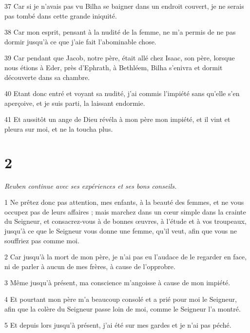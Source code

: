 \par 37 Car si je n'avais pas vu Bilha se baigner dans un endroit couvert, je ne serais pas tombé dans cette grande iniquité.

\par 38 Car mon esprit, pensant à la nudité de la femme, ne m'a permis de ne pas dormir jusqu'à ce que j'aie fait l'abominable chose.

\par 39 Car pendant que Jacob, notre père, était allé chez Isaac, son père, lorsque nous étions à Eder, près d'Ephrath, à Bethléem, Bilha s'enivra et dormit découverte dans sa chambre.

\par 40 Etant donc entré et voyant sa nudité, j'ai commis l'impiété sans qu'elle s'en aperçoive, et je suis parti, la laissant endormie.

\par 41 Et aussitôt un ange de Dieu révéla à mon père mon impiété, et il vint et pleura sur moi, et ne la toucha plus.

\chapter{2}

\par \textit{Reuben continue avec ses expériences et ses bons conseils.}

\par 1 Ne prêtez donc pas attention, mes enfants, à la beauté des femmes, et ne vous occupez pas de leurs affaires ; mais marchez dans un cœur simple dans la crainte du Seigneur, et consacrez-vous à de bonnes œuvres, à l'étude et à vos troupeaux, jusqu'à ce que le Seigneur vous donne une femme, qu'il veut, afin que vous ne souffriez pas comme moi.

\par 2 Car jusqu'à la mort de mon père, je n'ai pas eu l'audace de le regarder en face, ni de parler à aucun de mes frères, à cause de l'opprobre.

\par 3 Même jusqu'à présent, ma conscience m'angoisse à cause de mon impiété.

\par 4 Et pourtant mon père m'a beaucoup consolé et a prié pour moi le Seigneur, afin que la colère du Seigneur passe loin de moi, comme le Seigneur l'a montré.

\par 5 Et depuis lors jusqu'à présent, j'ai été sur mes gardes et je n'ai pas péché.

